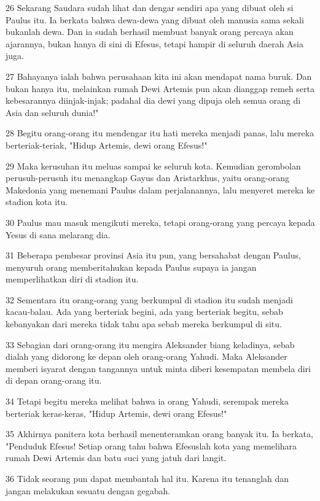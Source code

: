 \par 26 Sekarang Saudara sudah lihat dan dengar sendiri apa yang dibuat oleh si Paulus itu. Ia berkata bahwa dewa-dewa yang dibuat oleh manusia sama sekali bukanlah dewa. Dan ia sudah berhasil membuat banyak orang percaya akan ajarannya, bukan hanya di sini di Efesus, tetapi hampir di seluruh daerah Asia juga.
\par 27 Bahayanya ialah bahwa perusahaan kita ini akan mendapat nama buruk. Dan bukan hanya itu, melainkan rumah Dewi Artemis pun akan dianggap remeh serta kebesarannya diinjak-injak; padahal dia dewi yang dipuja oleh semua orang di Asia dan seluruh dunia!"
\par 28 Begitu orang-orang itu mendengar itu hati mereka menjadi panas, lalu mereka berteriak-teriak, "Hidup Artemis, dewi orang Efesus!"
\par 29 Maka kerusuhan itu meluas sampai ke seluruh kota. Kemudian gerombolan perusuh-perusuh itu menangkap Gayus dan Aristarkhus, yaitu orang-orang Makedonia yang menemani Paulus dalam perjalanannya, lalu menyeret mereka ke stadion kota itu.
\par 30 Paulus mau masuk mengikuti mereka, tetapi orang-orang yang percaya kepada Yesus di sana melarang dia.
\par 31 Beberapa pembesar provinsi Asia itu pun, yang bersahabat dengan Paulus, menyuruh orang memberitahukan kepada Paulus supaya ia jangan memperlihatkan diri di stadion itu.
\par 32 Sementara itu orang-orang yang berkumpul di stadion itu sudah menjadi kacau-balau. Ada yang berteriak begini, ada yang berteriak begitu, sebab kebanyakan dari mereka tidak tahu apa sebab mereka berkumpul di situ.
\par 33 Sebagian dari orang-orang itu mengira Aleksander biang keladinya, sebab dialah yang didorong ke depan oleh orang-orang Yahudi. Maka Aleksander memberi isyarat dengan tangannya untuk minta diberi kesempatan membela diri di depan orang-orang itu.
\par 34 Tetapi begitu mereka melihat bahwa ia orang Yahudi, serempak mereka berteriak keras-keras, "Hidup Artemis, dewi orang Efesus!"
\par 35 Akhirnya panitera kota berhasil menenteramkan orang banyak itu. Ia berkata, "Penduduk Efesus! Setiap orang tahu bahwa Efesuslah kota yang memelihara rumah Dewi Artemis dan batu suci yang jatuh dari langit.
\par 36 Tidak seorang pun dapat membantah hal itu. Karena itu tenanglah dan jangan melakukan sesuatu dengan gegabah.
